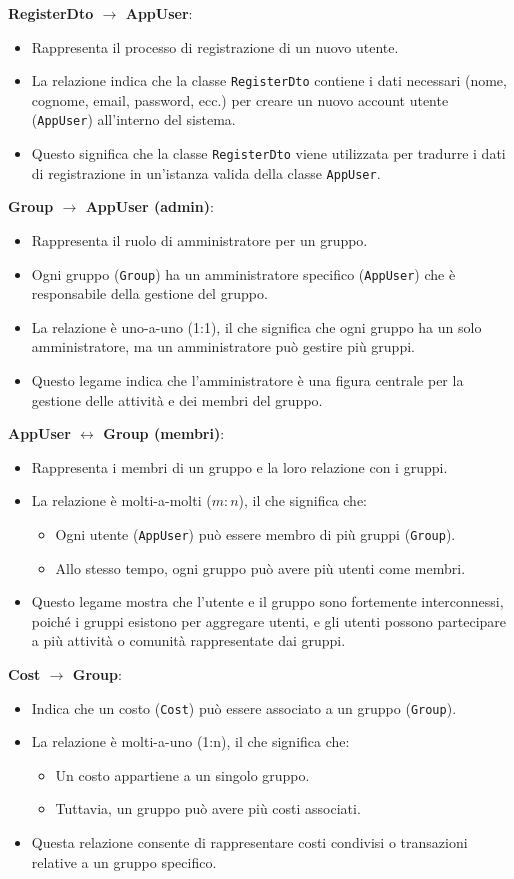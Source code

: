 \textbf{RegisterDto $\rightarrow$ AppUser}: \begin{itemize} \item Rappresenta il processo di registrazione di un nuovo utente. \item La relazione indica che la classe \texttt{RegisterDto} contiene i dati necessari (nome, cognome, email, password, ecc.) per creare un nuovo account utente (\texttt{AppUser}) all'interno del sistema. \item Questo significa che la classe \texttt{RegisterDto} viene utilizzata per tradurre i dati di registrazione in un'istanza valida della classe \texttt{AppUser}. \end{itemize}
\textbf{Group $\rightarrow$ AppUser (admin)}: \begin{itemize} \item Rappresenta il ruolo di amministratore per un gruppo. \item Ogni gruppo (\texttt{Group}) ha un amministratore specifico (\texttt{AppUser}) che è responsabile della gestione del gruppo. \item La relazione è uno-a-uno (1:1), il che significa che ogni gruppo ha un solo amministratore, ma un amministratore può gestire più gruppi. \item Questo legame indica che l'amministratore è una figura centrale per la gestione delle attività e dei membri del gruppo. \end{itemize}
\textbf{AppUser $\leftrightarrow$ Group (membri)}: \begin{itemize} \item Rappresenta i membri di un gruppo e la loro relazione con i gruppi. \item La relazione è molti-a-molti ($m:n$), il che significa che: \begin{itemize} \item Ogni utente (\texttt{AppUser}) può essere membro di più gruppi (\texttt{Group}). \item Allo stesso tempo, ogni gruppo può avere più utenti come membri. \end{itemize} \item Questo legame mostra che l'utente e il gruppo sono fortemente interconnessi, poiché i gruppi esistono per aggregare utenti, e gli utenti possono partecipare a più attività o comunità rappresentate dai gruppi. \end{itemize}
\textbf{Cost $\rightarrow$ Group}: \begin{itemize} \item Indica che un costo (\texttt{Cost}) può essere associato a un gruppo (\texttt{Group}). \item La relazione è molti-a-uno (1:n), il che significa che: \begin{itemize} \item Un costo appartiene a un singolo gruppo. \item Tuttavia, un gruppo può avere più costi associati. \end{itemize} \item Questa relazione consente di rappresentare costi condivisi o transazioni relative a un gruppo specifico. \end{itemize}
